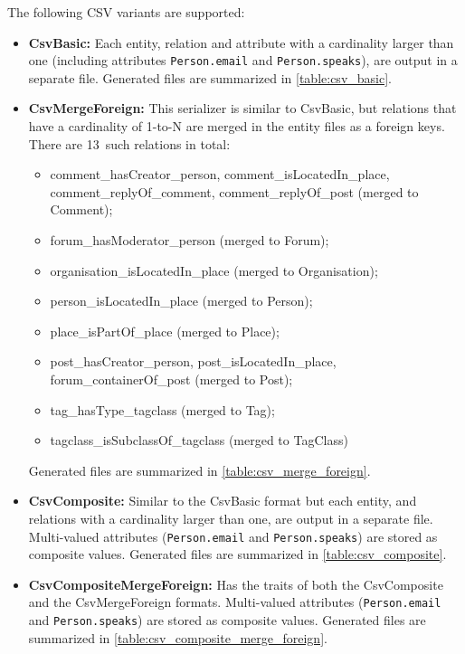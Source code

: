 The following CSV variants are supported:
    \begin{itemize}
      \item \textbf{CsvBasic:}
      Each entity, relation and attribute with a cardinality larger than one (including attributes \texttt{Person.email} and \texttt{Person.speaks}), are output in a separate file.
      Generated files are summarized in \autoref{table:csv_basic}.

      \item \textbf{CsvMergeForeign:}
      This serializer is similar to CsvBasic, but relations that have a cardinality of 1-to-N are merged in the entity files as a foreign keys.
      There are 13~such relations in total:
      \begin{itemize}
          \item comment\_hasCreator\_person, comment\_isLocatedIn\_place, comment\_replyOf\_comment, comment\_replyOf\_post (merged to Comment);
          \item forum\_hasModerator\_person (merged to Forum);
          \item organisation\_isLocatedIn\_place (merged to Organisation);
          \item person\_isLocatedIn\_place (merged to Person);
          \item place\_isPartOf\_place (merged to Place);
          \item post\_hasCreator\_person, post\_isLocatedIn\_place, forum\_containerOf\_post (merged to Post);
          \item tag\_hasType\_tagclass (merged to Tag);
          \item tagclass\_isSubclassOf\_tagclass (merged to TagClass)
      \end{itemize}
      Generated files are summarized in \autoref{table:csv_merge_foreign}.

      \item \textbf{CsvComposite:}
      Similar to the CsvBasic format but each entity, and relations with a cardinality larger than one, are output in a separate file.
      Multi-valued attributes (\texttt{Person.email} and \texttt{Person.speaks}) are stored as composite values.
      Generated files are summarized in \autoref{table:csv_composite}.

      \item \textbf{CsvCompositeMergeForeign:}
      Has the traits of both the CsvComposite and the CsvMergeForeign formats.
      Multi-valued attributes (\texttt{Person.email} and \texttt{Person.speaks}) are stored as composite values.
      Generated files are summarized in \autoref{table:csv_composite_merge_foreign}.
    \end{itemize}

